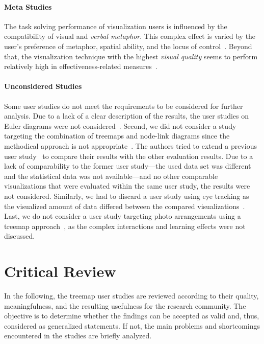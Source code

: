 \documentclass[sigconf,
natbib=true]{acmart}
\begin{document}
\paragraph{\textbf{Meta Studies}}
The task solving performance of visualization users is influenced by the compatibility of visual and \emph{verbal metaphor}. 
This complex effect is varied by the user's preference of metaphor, spatial ability, and the locus of control~\cite{ziemkiewicz2008-metaphors,ziemkiewicz2011-locus}.
Beyond that, the visualization technique with the highest \emph{visual quality} seems to perform relatively high in effectiveness-related measures~\cite{cawthon2007-aesthetic}.
\paragraph{\textbf{Unconsidered Studies}}
Some user studies do not meet the requirements to be considered for further analysis.
Due to a lack of a clear description of the results, the user studies on Euler diagrams were not considered~\cite{sathiyanarayanan2015-euler, sathiyanarayanan2015-graph}.
Second, we did not consider a study targeting the combination of treemaps and node-link diagrams since the methodical approach is not appropriate~\cite{linsen2011-nodelink}.
The authors tried to extend a previous user study~\cite{kobsa2004-systems} to compare their results with the other evaluation results.
Due to a lack of comparability to the former user study---the used data set was different and the statistical data was not available---and no other comparable visualizations that were evaluated within the same user study, the results were not considered.
Similarly, we had to discard a user study using eye tracking as the visualized amount of data differed between the compared visualizations~\cite{mathews2012-eyetracking}.
Last, we do not consider a user study targeting photo arrangements using a treemap approach~\cite{guerra-gomez2016-photo}, as the complex interactions and learning effects were not discussed.

\section{Critical Review} %
In the following, the treemap user studies are reviewed according to their quality, meaningfulness, and the resulting usefulness for the research community.
The objective is to determine whether the findings can be accepted as valid and, thus, considered as generalized statements.
If not, the main problems and shortcomings encountered in the studies are briefly analyzed.
\end{document}
